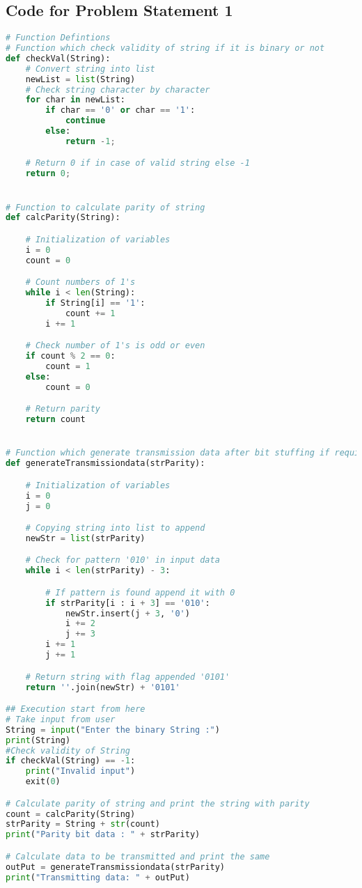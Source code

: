 \documentclass[11pt,oneside]{book}
\begin{document}
\begin{appendices}
\chapter{Code for Problem Statement 1}

\begin{lstlisting}[language=Python, frame='single']
# Function Defintions
# Function which check validity of string if it is binary or not
def checkVal(String):
	# Convert string into list
	newList = list(String)
	# Check string character by character 
	for char in newList:
		if char == '0' or char == '1':
			continue
		else:
			return -1;

	# Return 0 if in case of valid string else -1
	return 0;


# Function to calculate parity of string
def calcParity(String):

	# Initialization of variables
	i = 0
	count = 0

	# Count numbers of 1's
	while i < len(String):
		if String[i] == '1':
			count += 1
		i += 1

	# Check number of 1's is odd or even
	if count % 2 == 0:
		count = 1
	else:
		count = 0

	# Return parity
	return count


# Function which generate transmission data after bit stuffing if required
def generateTransmissiondata(strParity):

	# Initialization of variables
	i = 0
	j = 0

	# Copying string into list to append
	newStr = list(strParity)

	# Check for pattern '010' in input data
	while i < len(strParity) - 3:

		# If pattern is found append it with 0
		if strParity[i : i + 3] == '010':
			newStr.insert(j + 3, '0')
			i += 2
			j += 3
		i += 1
		j += 1

	# Return string with flag appended '0101' 
	return ''.join(newStr) + '0101'

## Execution start from here
# Take input from user
String = input("Enter the binary String :")
print(String)
#Check validity of String
if checkVal(String) == -1:
	print("Invalid input")
	exit(0)

# Calculate parity of string and print the string with parity
count = calcParity(String)
strParity = String + str(count)
print("Parity bit data : " + strParity)

# Calculate data to be transmitted and print the same
outPut = generateTransmissiondata(strParity)
print("Transmitting data: " + outPut)




\end{lstlisting}
\end{appendices}
\end{document}
